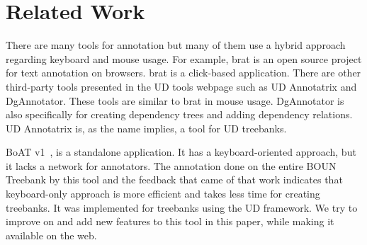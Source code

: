 \section{Related Work}
\label{sec:related}

There are many tools for annotation but many of them use a hybrid approach regarding keyboard and mouse usage.
For example, brat is an open source project for text annotation on browsers.\cite{brat}\cite{UD}
brat is a click-based application.
There are other third-party tools presented in the UD tools webpage such as UD Annotatrix\cite{tyers-etal:2018} and DgAnnotator\cite{dgannotator}.
These tools are similar to brat in mouse usage.
DgAnnotator is also specifically for creating dependency trees and adding dependency relations.
UD Annotatrix is, as the name implies, a tool for UD treebanks.

BoAT v1~\cite{turk-etal-2019-turkish}, is a standalone application.
It has a keyboard-oriented approach, but it lacks a network for annotators.
The annotation done on the entire BOUN Treebank by this tool and the feedback that came of that work indicates that keyboard-only approach is more efficient and takes less time for creating treebanks.
It was implemented for treebanks using the UD framework.
We try to improve on and add new features to this tool in this paper, while making it available on the web.
